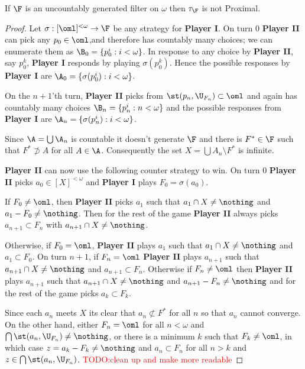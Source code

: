 \documentclass{article}
\begin{document}
\begin{prop}
    If \(\F\) is an uncountably generated filter on \(\omega\) then \(\tau_{\F}\) is not Proximal.
\end{prop}
\begin{proof}
    Let \(\sigma : [\oml]^{<\omega} \to \F\) be any strategy for \textbf{Player I}. On turn \(0\) \textbf{Player II} can pick any \(p_0 \in \oml\),and therefore has countably many choices; we can enumerate them as \(\B_0 = \{p_0^i: i < \omega\}\). In response to any choice by \textbf{Player II}, say \(p_0^k\), \textbf{Player I} responds by playing \(\sigma(p_0^k)\). Hence the possible responses by \textbf{Player I} are \(\A_0 = \{\sigma(p_0^i): i < \omega\}\). 
    
    On the \(n + 1\)'th turn, \textbf{Player II} picks from \(\st(p_n, \U_{F_n}) \subset \oml\) and again has countably many choices \(\B_n = \{p_n^i:n < \omega\}\) and the possible responses from \textbf{Player I} are \(\A_n = \{\sigma(p_n^i):i < \omega\}\).

    Since \(\A = \bigcup \A_n\) is countable it doesn't generate \(\F\) and there is \(F^{\ast} \in \F\) such that \(F^{\ast} \not \supset A\) for all \(A \in \A\). Consequently the set \(X = \bigcup A_n\setminus F^{\ast}\) is infinite.

    \textbf{Player II} can now use the following counter strategy to win. On turn 0 \textbf{Player II} picks \(a_0 \in [X]^{<\omega}\) and \textbf{Player I} plays \(F_0 = \sigma(a_0)\). 
    
    If \(F_0 \neq \oml\), then \textbf{Player II} picks \(a_1\) such that \(a_1 \cap X \neq\nothing\) and \(a_1 - F_0 \neq \nothing\). Then for the rest of the game \textbf{Player II} always picks \(a_{n + 1} \subset F_n\) with \(a_{n + 1}\cap X \neq \nothing\).
    
    Otherwise, if \(F_0 = \oml\), \textbf{Player II} plays \(a_1\) such that \(a_1\cap X \neq \nothing\) and \(a_1 \subset F_0\). On turn \(n + 1\), if \(F_n = \oml\) \textbf{Player II} plays \(a_{n + 1}\) such that \(a_{n + 1}\cap X \neq \nothing\) and \(a_{n + 1}\subset F_n\). Otherwise if \(F_n \neq \oml\) then \textbf{Player II} plays \(a_{n + 1}\) such that \(a_{n + 1}\cap X \neq \nothing\) and \(a_{n + 1} - F_n \neq\nothing\) and for the rest of the game picks \(a_k \subset F_k\).

    Since each \(a_n\) meets \(X\) its clear that \(a_n \not \subset F^{\ast}\) for all \(n\) so that \(a_n\) cannot converge. On the other hand, either \(F_n = \oml\) for all \(n < \omega\) and 
    \(\bigcap\st(a_n, \U_{F_n}) \neq\nothing\), or there is a minimum \(k\) such that \(F_k \neq \oml\), in which case \(z = a_k - F_k \neq \nothing\) and \(a_n \subset F_n\) for all \(n > k\) and \(z \in \bigcap\st(a_n, \U_{F_n})\). 
    \textcolor{red}{TODO:clean up and make more readable}
\end{proof}
\end{document}
